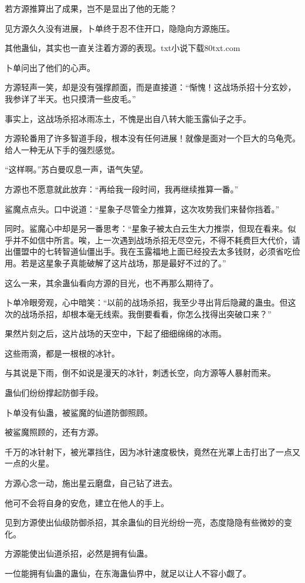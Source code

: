 \begin{this_body}
若方源推算出了成果，岂不是显出了他的无能？

见方源久久没有进展，卜单终于忍不住开口，隐隐向方源施压。

其他蛊仙，其实也一直关注着方源的表现。txt小说下载80txt.com

卜单问出了他们的心声。

方源轻声一笑，却是没有强撑颜面，而是直接道：“惭愧！这战场杀招十分玄妙，我参详了半天。也只摸清一些皮毛。”

事实上，这战场杀招冰雨冻土，不愧是出自八转大能玉露仙子之手。

方源轮番用了许多智道手段，根本没有任何进展！就像是面对一个巨大的乌龟壳。给人一种无从下手的强烈感觉。

“这样啊。”苏白曼叹息一声，语气失望。

方源也不愿意就此放弃：“再给我一段时间，我再继续推算一番。”

鲨魔点点头。口中说道：“星象子尽管全力推算，这次攻势我们来替你挡着。”

同时。鲨魔心中却是另一番思考：“星象子被太白云生大力推崇，但现在看来。似乎并不如信中所言。唉，上一次遇到战场杀招无尽空元，不得不耗费巨大代价，请出僵盟中的七转智道仙僵出手。我在玉露福地上面已经投去太多钱财，必须省吃俭用。若是这星象子真能破解了这片战场，那是最好不过的了。”

这么一来，其余蛊仙看向方源的目光，也不再那么期待了。

卜单冷眼旁观，心中暗笑：“以前的战场杀招，我至少寻出背后隐藏的蛊虫。但这次的战场杀招，却根本毫无线索。我倒要看看，你怎么找得出突破口来？”

果然片刻之后，这片战场的天空中，下起了细细绵绵的冰雨。

这些雨滴，都是一根根的冰针。

与其说是下雨，倒不如说是漫天的冰针，刺透长空，向方源等人暴射而来。

蛊仙们纷纷撑起防御手段。

卜单没有仙蛊，被鲨魔的仙道防御照顾。

被鲨魔照顾的，还有方源。

千万的冰针射下，被光罩挡住，因为冰针速度极快，竟然在光罩上击打出了一点又一点的火星。

方源心念一动，施出星云磨盘，自己钻了进去。

他可不会将自身的安危，建立在他人的手上。

见到方源使出仙级防御杀招，其余蛊仙的目光纷纷一亮，态度隐隐有些微妙的变化。

方源能使出仙道杀招，必然是拥有仙蛊。

一位能拥有仙蛊的蛊仙，在东海蛊仙界中，就足以让人不容小觑了。


\end{this_body}
